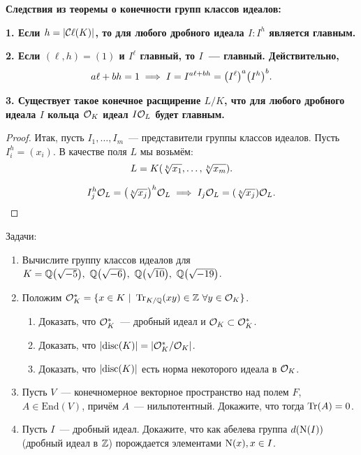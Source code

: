 	\noindent\bf{Следствия из теоремы о конечности групп классов идеалов:}

	\bf{1.} Если $h = \left\lvert \operatorname{\mathcal{C}\mathbf{\ell}}(K) \right\rvert$,  то для любого дробного идеала $I\colon I^{h}$ является главным.

	\bf{2.} Если $(\ell, h) = (1)$ и $I^{\ell}$ главный, то $I$~--- главный. Действительно, 
	\[
		a\ell + bh = 1 \implies I = I^{a\ell + bh} = \lr*{I^{\ell}}^{a} \lr*{I^{h}}^{b}.
	\]

	\bf{3.} Существует такое конечное расщирение $L/K$, что для любого дробного идеала $I$ кольца $\mathcal{O}_{K}$ идеал $I\mathcal{O}_{L}$ будет главным.
	\begin{proof}
		Итак, пусть $I_1, \ldots, I_{m}$~--- представители группы классов идеалов. Пусть $I_i^{h} = (x_i)$. В качестве поля $L$ мы возьмём: 
		\[
			L = K\lr*{\sqrt[h]{x_1}, \ldots, \sqrt[h]{x_m}}.
		\]

		\[
			I_{j}^h \cO_{L} = \lr*{\sqrt[h]{x_j}}^{h}\cO_{L} \implies I_j\cO_{L} = (\sqrt[h]{x_j})\cO_{L}. 
		\]
	\end{proof}

	\begin{homework}\label{hw_6}
		Задачи: 
		\begin{enumerate}
			\item Вычислите группу классов идеалов для $K = \Q\lr*{\sqrt{-5}}, \ \Q\lr*{\sqrt{-6}}, \ \Q\lr*{\sqrt{10}}, \ \Q\lr*{\sqrt{-19}}$.

			\item Положим $\cO_{K}^{*} = \{ x \in K \ \vert \ \Tr_{K/\Q}(xy) \in \Z \ \forall y \in \cO_{K} \}$.
				\begin{enumerate}
					\item Доказать, что $\mathcal{O}_{K}^{*}$~--- дробный идеал и $\mathcal{O}_{K} \subset \mathcal{O}_{K}^{*}$.

					\item Доказать, что $\left\lvert \operatorname{disc}(K) \right\rvert = \left\lvert \mathcal{O}_{K}^*/\mathcal{O}_{K} \right\rvert$.

					\item Доказать, что $\left\lvert \operatorname{disc}(K) \right\rvert$ есть норма некоторого идеала в $\mathcal{O}_{K}$.
				\end{enumerate}
			\item Пусть $V$~--- конечномерное векторное пространство над полем $F$, $A \in \mathrm{End}(V)$, причём $A$~--- нильпотентный. Докажите, что тогда $\operatorname{Tr}(A) = 0$.

			\item Пусть $I$~--- дробный идеал. Докажите, что как абелева группа $d\lr*{\Nm(I)}$ (дробный идеал в $\mathbb{Z}$) порождается элементами $\operatorname{\mathrm{N}}(x), x \in I$.
		\end{enumerate}

	\end{homework}




	